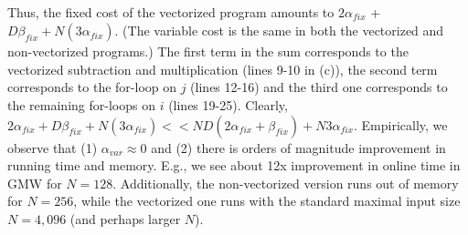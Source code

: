 Thus, the fixed cost of the vectorized program amounts to
$2\alpha_\mathit{fix}$ + $D \beta_\mathit{fix} + N(3\alpha_\mathit{fix})$. (The variable cost is the same in both the vectorized and non-vectorized programs.)
The first term in the sum corresponds to the vectorized
subtraction and multiplication (lines 9-10 in (c)), the second term corresponds to the for-loop on $j$ (lines 12-16) and the third
one corresponds to the remaining for-loops on $i$ (lines 19-25). 
Clearly, $2\alpha_\mathit{fix} + D\beta_\mathit{fix} + N(3\alpha_\mathit{fix}) << ND(2\alpha_\mathit{fix}+\beta_\mathit{fix}) + N3\alpha_\mathit{fix}$.
Empirically, we observe that (1) $\alpha_\mathit{var} \approx 0$ and (2) there is orders of magnitude improvement in running time and memory. 
E.g., we see about 12x improvement in online time in GMW for $N=128$. Additionally, the non-vectorized version runs out of memory for $N=256$, 
while the vectorized one runs with the standard maximal input size $N=4,096$ (and perhaps larger $N$).
